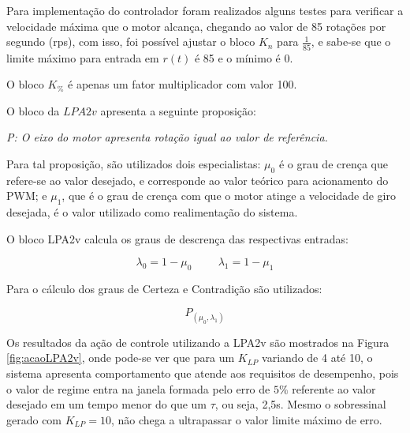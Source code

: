 Para implementação do controlador foram realizados alguns testes 
para verificar a velocidade máxima que o motor alcança, 
chegando ao valor de 85 rotações por segundo (rps), com isso, 
foi possível ajustar o bloco $K_n$ para $\frac{1}{85}$, 
e sabe-se que o limite máximo para entrada em $r(t)$ é 85 e o mínimo é 0.

O bloco $K_\%$ é apenas um fator multiplicador com valor 100.

O bloco da $LPA2v$ apresenta a seguinte proposição:

\emph{ P: O eixo do motor apresenta rotação igual ao valor de referência.}

Para tal proposição, 
são utilizados dois especialistas: 
$\mu _0$ é o grau de crença que refere-se ao valor desejado, 
e corresponde ao valor teórico para acionamento do PWM;
e $\mu _1$, que é o grau de crença com que o motor 
atinge a velocidade de giro desejada, 
é o valor utilizado como realimentação do sistema.

O bloco LPA2v calcula os graus de descrença das respectivas entradas:

\begin{equation}
\lambda _0 = 1- \mu _0   \hspace{1cm}   \lambda _1 = 1 - \mu_1 
\end{equation}

Para o cálculo dos graus de Certeza e Contradição são utilizados:

\begin{equation}
P _{(\mu_0, \lambda_1)}
\end{equation}


Os resultados da ação de controle utilizando a LPA2v são mostrados na 
Figura \ref{fig:acaoLPA2v}, onde pode-se ver que 
para um $K_{LP}$ variando de 4 até 10, 
o sistema apresenta comportamento que atende aos requisitos de desempenho,
pois o valor de regime entra na janela formada pelo erro de $5\%$ referente
ao valor desejado em um tempo menor do que um $\tau$, ou seja, 2,5s.
Mesmo o sobressinal gerado com $K_{LP} = 10$, 
não chega a ultrapassar o valor limite máximo de erro. 


